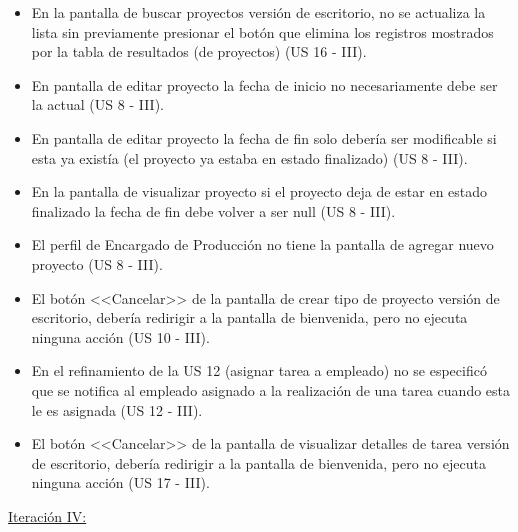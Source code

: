 \documentclass[a4paper, 12pt,twoside]{report}  %
\numberwithin{equation}{subsection} %
\begin{document}
\begin{itemize}
	\item En la pantalla de buscar proyectos versión de escritorio, no se actualiza la lista sin previamente presionar el botón que elimina los registros mostrados por la tabla de resultados (de proyectos) (US 16 - III).
	\item En pantalla de editar proyecto la fecha de inicio no necesariamente debe ser la actual (US 8 - III).
	\item En pantalla de editar proyecto la fecha de fin solo debería ser modificable si esta ya existía (el proyecto ya estaba en estado finalizado) (US 8 - III).
	\item En la pantalla de visualizar proyecto si el proyecto deja de estar en estado finalizado la fecha de fin debe volver a ser null (US 8 - III).
	\item El perfil de Encargado de Producción no tiene la pantalla de agregar nuevo proyecto (US 8 - III).
	\item El botón <<Cancelar>> de la pantalla de crear tipo de proyecto versión de escritorio, debería redirigir a la pantalla de bienvenida, pero no ejecuta ninguna acción (US 10 - III).
	\item En el refinamiento de la US 12 (asignar tarea a empleado) no se especificó que se notifica al empleado asignado a la realización de una tarea cuando esta le es asignada (US 12 - III).
	\item El botón <<Cancelar>> de la pantalla de visualizar detalles de tarea versión de escritorio, debería redirigir a la pantalla de bienvenida, pero no ejecuta ninguna acción (US 17 - III).
\end{itemize}
\underline{Iteración IV:}
\end{document}

